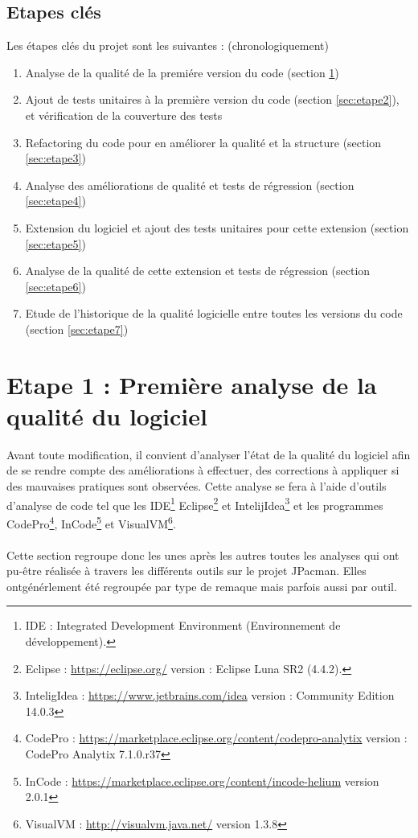 \documentclass[12pt,a4paper,final]{article}
\begin{document}
\subsection{Etapes clés}
Les étapes clés du projet sont les suivantes : (chronologiquement)
\begin{enumerate}
\item Analyse de la qualité de la premiére version du code (section \ref{sec:etape1})
\item Ajout de tests unitaires à la première version du code (section \ref{sec:etape2}), et vérification de la couverture des tests
\item Refactoring du code pour en améliorer la qualité et la structure (section \ref{sec:etape3})
\item Analyse des améliorations de qualité et tests de régression (section \ref{sec:etape4})
\item Extension du logiciel et ajout des tests unitaires pour cette extension (section \ref{sec:etape5})
\item Analyse de la qualité de cette extension et tests de régression (section \ref{sec:etape6})
\item Etude de l'historique de la qualité logicielle entre toutes les versions du code (section \ref{sec:etape7})
\end{enumerate}
\section{Etape 1 : Première analyse de la qualité du logiciel}\label{sec:etape1}
Avant toute modification, il convient d'analyser l'état de la qualité du logiciel afin de se rendre compte des améliorations à effectuer, des corrections à appliquer si des mauvaises pratiques sont observées. Cette analyse se fera à l'aide d'outils d'analyse de code tel que les IDE\footnote{IDE : Integrated Development Environment (Environnement de développement).} Eclipse\footnote{Eclipse : \url{https://eclipse.org/} version : Eclipse Luna SR2 (4.4.2).} et IntelijIdea\footnote{InteligIdea : \url{https://www.jetbrains.com/idea} version : Community Edition 14.0.3 } et les programmes CodePro\footnote{CodePro : \url{https://marketplace.eclipse.org/content/codepro-analytix} version : CodePro Analytix 7.1.0.r37}, InCode\footnote{InCode : \url{https://marketplace.eclipse.org/content/incode-helium} version 2.0.1} et VisualVM\footnote{VisualVM : \url{http://visualvm.java.net/} version 1.3.8}.\\ \\
Cette section regroupe donc les unes après les autres toutes les analyses qui ont pu-être réalisée à travers les différents outils sur le projet JPacman. Elles ontgénérlement été regroupée par type de remaque mais parfois aussi par outil.
\end{document}
